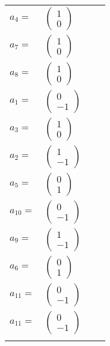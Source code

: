 \documentclass[1p]{elsarticle_modified}
\theoremstyle{definition}
\begin{document}
\begin{tabular}{m{7pt} m{180pt} m{7pt} m{180pt} }
\flushright $a_{4}=$&$\begin{pmatrix}1\\0\end{pmatrix}$ \\
\flushright $a_{7}=$&$\begin{pmatrix}1\\0\end{pmatrix}$ \\
\flushright $a_{8}=$&$\begin{pmatrix}1\\0\end{pmatrix}$ \\
\flushright $a_{1}=$&$\begin{pmatrix}0\\-1\end{pmatrix}$ \\
\flushright $a_{3}=$&$\begin{pmatrix}1\\0\end{pmatrix}$ \\
\flushright $a_{2}=$&$\begin{pmatrix}1\\-1\end{pmatrix}$ \\
\flushright $a_{5}=$&$\begin{pmatrix}0\\1\end{pmatrix}$ \\
\flushright $a_{10}=$&$\begin{pmatrix}0\\-1\end{pmatrix}$ \\
\flushright $a_{9}=$&$\begin{pmatrix}1\\-1\end{pmatrix}$ \\
\flushright $a_{6}=$&$\begin{pmatrix}0\\1\end{pmatrix}$ \\
\flushright $a_{11}=$&$\begin{pmatrix}0\\-1\end{pmatrix}$\\ \flushright $a_{11}=$&$\begin{pmatrix}0\\-1\end{pmatrix}$\\&\end{tabular}
\end{document}
